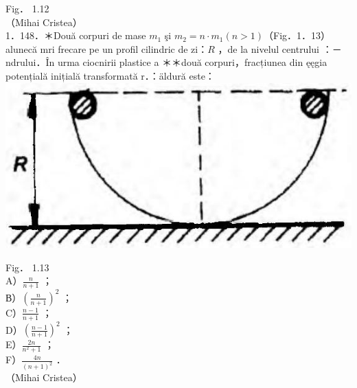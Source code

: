 \documentclass[10pt]{article}
\begin{document}
Fig． 1.12\\
（Mihai Cristea）\\
1．148．＊Două corpuri de mase $m_{1}$ şi $m_{2}=n \cdot m_{1}(n>1)$（Fig．1．13）alunecă mri frecare pe un profil cilindric de zi：$R$ ，de la nivelul centrului ：－ndrului．În urma ciocnirii plastice a ＊＊două corpuri，fracțiunea din ęęgia potențială inițială transformată r．：äldură este：\\
\includegraphics[max width=\textwidth, center]{2025_07_01_5b3ff9fa0d508c8e9f17g-035(1)}

Fig． 1.13\\
A）$\frac{n}{n+1}$ ；\\
В）$\left(\frac{n}{n+1}\right)^{2}$ ；\\
C）$\frac{n-1}{n+1}$ ；\\
D）$\left(\frac{n-1}{n+1}\right)^{2}$ ；\\
E）$\frac{2 n}{n^{2}+1}$ ；\\
F）$\frac{4 n}{(n+1)^{2}}$ ．\\
（Mihai Cristea）
\end{document}
